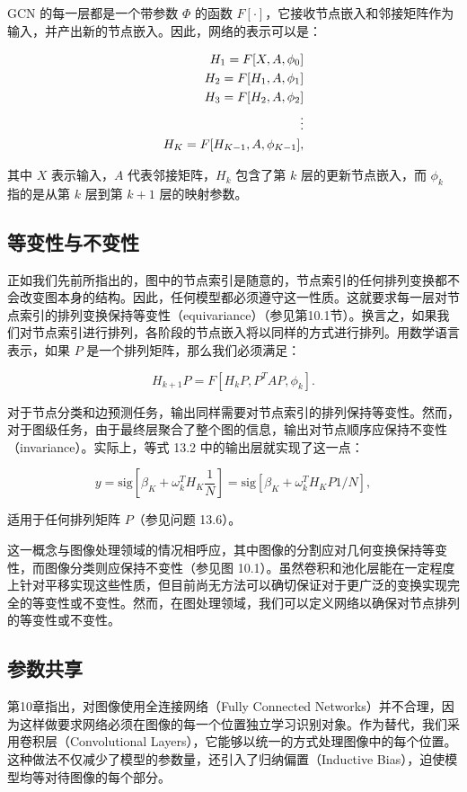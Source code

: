 GCN 的每一层都是一个带参数 \(\Phi\) 的函数 \(F[\cdot]\)，它接收节点嵌入和邻接矩阵作为输入，并产出新的节点嵌入。因此，网络的表示可以是：


\begin{align}
H_1 = F[X, A, \phi_0] \notag \\
H_2 = F[H_1, A, \phi_1] \notag \\
H_3 = F[H_2, A, \phi_2] \notag \\
\vdots \notag \\
H_K = F[H_{K-1}, A, \phi_{K-1}], 
\end{align} 


其中 \(X\) 表示输入，\(A\) 代表邻接矩阵，\(H_k\) 包含了第 \(k\) 层的更新节点嵌入，而 \(\phi_k\) 指的是从第 \(k\) 层到第 \(k+1\) 层的映射参数。

\subsection{等变性与不变性}
正如我们先前所指出的，图中的节点索引是随意的，节点索引的任何排列变换都不会改变图本身的结构。因此，任何模型都必须遵守这一性质。这就要求每一层对节点索引的排列变换保持等变性（equivariance）（参见第10.1节）。换言之，如果我们对节点索引进行排列，各阶段的节点嵌入将以同样的方式进行排列。用数学语言表示，如果 \(P\) 是一个排列矩阵，那么我们必须满足：

\begin{equation}
H_{k+1}P = F[H_kP, P^TAP, \phi_k]. 
\end{equation}

对于节点分类和边预测任务，输出同样需要对节点索引的排列保持等变性。然而，对于图级任务，由于最终层聚合了整个图的信息，输出对节点顺序应保持不变性（invariance）。实际上，等式 13.2 中的输出层就实现了这一点：

\begin{equation}
y = \text{sig}[\beta_K + \omega_k^T H_K \frac{1}{N}] = \text{sig}[\beta_K + \omega_k^T H_KP1/N], 
\end{equation}

适用于任何排列矩阵 \(P\)（参见问题 13.6）。

这一概念与图像处理领域的情况相呼应，其中图像的分割应对几何变换保持等变性，而图像分类则应保持不变性（参见图 10.1）。虽然卷积和池化层能在一定程度上针对平移实现这些性质，但目前尚无方法可以确切保证对于更广泛的变换实现完全的等变性或不变性。然而，在图处理领域，我们可以定义网络以确保对节点排列的等变性或不变性。
\subsection{参数共享}
第10章指出，对图像使用全连接网络（Fully Connected Networks）并不合理，因为这样做要求网络必须在图像的每一个位置独立学习识别对象。作为替代，我们采用卷积层（Convolutional Layers），它能够以统一的方式处理图像中的每个位置。这种做法不仅减少了模型的参数量，还引入了归纳偏置（Inductive Bias），迫使模型均等对待图像的每个部分。

